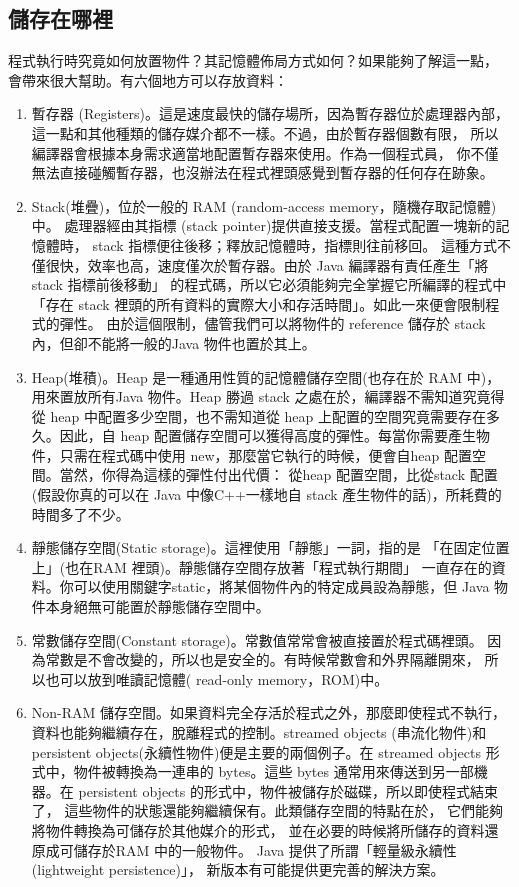 \subsection{儲存在哪裡}
程式執行時究竟如何放置物件？其記憶體佈局方式如何？如果能夠了解這一點，
會帶來很大幫助。有六個地方可以存放資料：
\begin{enumerate}
\item 暫存器 (Registers)。這是速度最快的儲存場所，因為暫存器位於處理器內部，
這一點和其他種類的儲存媒介都不一樣。不過，由於暫存器個數有限，
所以編譯器會根據本身需求適當地配置暫存器來使用。作為一個程式員，
你不僅無法直接碰觸暫存器，也沒辦法在程式裡頭感覺到暫存器的任何存在跡象。
\item Stack(堆疊)，位於一般的 RAM (random-access memory，隨機存取記憶體)中。
處理器經由其指標 (stack pointer)提供直接支援。當程式配置一塊新的記憶體時，
stack 指標便往後移；釋放記憶體時，指標則往前移回。
這種方式不僅很快，效率也高，速度僅次於暫存器。由於 Java 編譯器有責任產生「將
stack 指標前後移動」 的程式碼，所以它必須能夠完全掌握它所編譯的程式中「存在
stack 裡頭的所有資料的實際大小和存活時間」。如此一來便會限制程式的彈性。
由於這個限制，儘管我們可以將物件的 reference 儲存於
stack 內，但卻不能將一般的Java 物件也置於其上。
\item Heap(堆積)。Heap 是一種通用性質的記憶體儲存空間(也存在於 RAM 中)，
用來置放所有Java 物件。Heap 勝過 stack 之處在於，編譯器不需知道究竟得從
heap 中配置多少空間，也不需知道從 heap 上配置的空間究竟需要存在多久。因此，自
heap 配置儲存空間可以獲得高度的彈性。每當你需要產生物件，只需在程式碼中使用
new，那麼當它執行的時候，便會自heap 配置空間。當然，你得為這樣的彈性付出代價：
從heap 配置空間，比從stack 配置(假設你真的可以在 Java 中像C++一樣地自
stack 產生物件的話)，所耗費的時間多了不少。
\item 靜態儲存空間(Static storage)。這裡使用「靜態」一詞，指的是
「在固定位置上」(也在RAM 裡頭)。靜態儲存空間存放著「程式執行期間」
一直存在的資料。你可以使用關鍵字static，將某個物件內的特定成員設為靜態，但
Java 物件本身絕無可能置於靜態儲存空間中。
\item 常數儲存空間(Constant storage)。常數值常常會被直接置於程式碼裡頭。
因為常數是不會改變的，所以也是安全的。有時候常數會和外界隔離開來， 
所以也可以放到唯讀記憶體( read-only memory，ROM)中。
\item Non-RAM 儲存空間。如果資料完全存活於程式之外，那麼即使程式不執行，
資料也能夠繼續存在，脫離程式的控制。streamed objects
(串流化物件)和 persistent objects(永續性物件)便是主要的兩個例子。在
streamed objects 形式中，物件被轉換為一連串的 bytes。這些
bytes 通常用來傳送到另一部機器。在
persistent objects 的形式中，物件被儲存於磁碟，所以即使程式結束了，
這些物件的狀態還能夠繼續保有。此類儲存空間的特點在於，
它們能夠將物件轉換為可儲存於其他媒介的形式，
並在必要的時候將所儲存的資料還原成可儲存於RAM 中的一般物件。
Java 提供了所謂「輕量級永續性 (lightweight persistence)」，
新版本有可能提供更完善的解決方案。
\end{enumerate}
